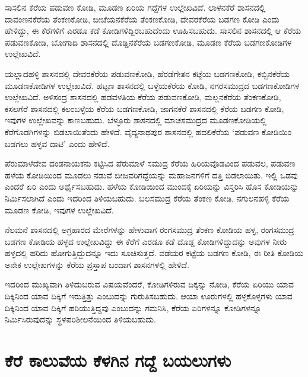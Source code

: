 ಸಾಸಲಿನ ಕೆರೆಯ ಪಡುವಣ ಕೋಡಿ, ಮೂಡಣ ಏರಿಯ ಗದ್ದೆಗಳ ಉಲ್ಲೇಖವಿದೆ. ಲಾಳನಕೆರೆ ಶಾಸನದಲ್ಲಿ ದಾವಂಣನಕೆರೆಯ ತೆಂಕಣಕೋಡಿ, ಬೀಚೆಯನಕೆರೆಯ ತೆಂಕಣಕೋಡಿ, ದೇವರಕೆರೆಯ ಬಡಗಣ ಕೋಡಿ ಎಂದು ಹೇಳಿದ್ದು, ಈ ಕೆರೆಗಳಿಗೆ ಎರಡೂ ಕಡೆ ಕೋಡಿಗಳಿದ್ದಿರಬಹುದೆಂದು ಊಹಿಸಬಹುದು. ಸಾಸಲಿನ ಶಾಸನದಲ್ಲಿ ಆ ಕೆರೆಯ ಪಡುವಣಕೋಡಿ, ಬೋಗಾದಿ ಶಾಸನದಲ್ಲಿ ದೊಡ್ಡಿನಕೆರೆಯ ಬಡಗಣಕೋಡಿ, ಮೂಡಣ ಕೆರೆಯ ಬಡಗಣಕೋಡಿಗಳ ಉಲ್ಲೇಖವಿದೆ.

ಯಲ್ಲಾದಹಳ್ಳಿ ಶಾಸನದಲ್ಲಿ ದೇವರಕೆರೆಯ ಪಡುವಣಕೋಡಿ, ಹೆರಡೆಗೇತನ ಕಟ್ಟೆಯ ಬಡಗಣಕೋಡಿ, ಕಬ್ಬಿನಕೆರೆಯ ಮೂಡಣಕೋಡಿಗಳ ಉಲ್ಲೇಖವಿದೆ. ಹಟ್ಟಣ ಶಾಸನದಲ್ಲಿ ಬಳ್ಳೆಯಕೆರೆಯ ಕೋಡಿ, ನಗರಸಮುದ್ರದ ಬಡಗಣಕೋಡಿಗಳ ಉಲ್ಲೇಖವಿದೆ. ಅಳಿಸಂದ್ರ ಶಾಸನದಲ್ಲಿ ಹಡವಳತಿಯ ಕೆರೆಯ ಪಡುವಣಕೋಡಿ, ಮಲ್ಲನಕೆರೆಯ ತೆಂಕಣಕೋಡಿ, ಕಸಲಗೆರೆ ಶಾಸನದಲ್ಲಿ ಕಲಂಬಳ್ಳೆಯ ಕೆರೆಯ ಬಡಗಣಕೋಡಿ, ಜಾಗನಕೆರೆ ಶಾಸನದಲ್ಲಿ ಕೆರೆಯ ಬಡಗಣ ಕೋಡಿ, ಇವುಗಳ ಉಲ್ಲೇಖವನ್ನು ಕಾಣಬಹುದು. ಬೆಳ್ಳೂರು ಶಾಸನದಲ್ಲಿ ಮಾಚಸಮುದ್ರದ ಮೂಡಣಕೋಡಿಯಲ್ಲಿ ಕೆರೆಗೊಡಗಿಗಳನ್ನು ಬಿಡಲಾಯಿತೆಂದು ಹೇಳಿದೆ. ವೈದ್ಯನಾಥಪುರ ಶಾಸನದಲ್ಲಿ ಹದಲಿಕೆರೆಯ ‘ಪಡುವಣ ಕೋಡಿಯಿಂ ಬಡಗಲು ಹಳ್ಳವ ದಾಟಿ’ ಎಂದು ಹೇಳಿದೆ.

ಪೆರುಮಾಳೆದೇವ ದಂಡನಾಯಕನು ಕಟ್ಟಿಸಿದ ಪೆರುಮಾಳೆ ಸಮುದ್ರ ಕೆರೆಯ ಹಿರಿಯವೊಡವಿಂದ ಪಡುವಲ, ಪಡುವಣ ಹಳೆಯ ಕೋಡಿಯಿಂದ ಮೂಡಲು ನಡುವೆ ಬೀಜವರಿಗದ್ದೆಯನ್ನು ಮಹಾಜನಗಳಿಗೆ ದತ್ತಿ ಬಿಡಲಾಯಿತು. ಇಲ್ಲಿ ಒಡವು ಎಂದರೆ ಏರಿ ಎಂದು ಅರ್ಥೈಸಬಹುದು. ಹಳೆಯ ಕೋಡಿಯಿಂದ ಮುಂದಕ್ಕೆ ಏರಿಯನ್ನು ವಿಸ್ತರಿಸಿ ಹೊಸ ಕೋಡಿಯನ್ನು ನಿರ್ಮಿಸಲಾಗಿದೆ ಎಂದು ಇದರಿಂದ ತಿಳಿಯಬಹುದು. ಬಲಸಮುದ್ರ ಕೆರೆಯ ತೆಂಕಣ ಕೋಡಿ, ನಗುಲನಹಳ್ಳಿ ಕೆರೆಯ ಮೂಡಣ ಕೋಡಿ, ಇವುಗಳ ಉಲ್ಲೇಖವಿದೆ.

ನೆಲಮನೆ ಶಾಸನದಲ್ಲಿ ಅಗ್ರಹಾರದ ಮೇರೆಗಳನ್ನು ಹೇಳುವಾಗ ರಂಗಸಮುದ್ರ ತೆಂಕಣ ಕೋಡಿಯ ಹಳ್ಳ, ರಂಗಸಮುದ್ರ ಬಡಗಣ ಕೋಡಿಯ ಹಳ್ಳದ ಉಲ್ಲೇಖವಿದ್ದು ಈ ಕೆರೆಗೆ ಎರಡೂ ಕಡೆ ದೊಡ್ಡ ಕೋಡಿಗಳಿದ್ದುದನ್ನು ಅವುಗಳ ನೀರು ಹಳ್ಳದಲ್ಲಿ ಹರಿದು ಹೋಗುತ್ತಿದ್ದುದನ್ನೂ ಇದು ಸೂಚಿಸುತ್ತದೆ. ವಡೆಯರ ಕಟ್ಟೆಯ ಬಡಗಣ ಕೋಡಿ, ಈ ರೀತಿ ಕೋಡಿಯ ಅನೇಕ ಉಲ್ಲೇಖಗಳನ್ನು ಕೆರೆಯ ಪ್ರಸ್ತಾಪ ಬಂದಾಗ ಶಾಸನಗಳಲ್ಲಿ ಹೇಳಿದೆ.

ಇದರಿಂದ ಮುಖ್ಯವಾಗಿ ತಿಳಿದುಬರುವ ವಿಷಯವೆಂದರೆ, ಕೋಡಿಗಳಿರುವ ದಿಕ್ಕನ್ನು ನೋಡಿ, ಕೆರೆಯ ಏರಿಯು ಯಾವ ದಿಕ್ಕಿನಿಂದ ಯಾವ ದಿಕ್ಕಿಗೆ ಇರುತ್ತಿತ್ತು ಎಂಬುದನ್ನು ಗುರುತಿಸಬಹುದು. ಆಯಾ ಊರುಗಳಲ್ಲಿ ಹಳ್ಳಕೊಳ್ಳಗಳು ಯಾವ ದಿಕ್ಕಿನಿಂದ ಯಾವ ದಿಕ್ಕಿಗೆ ಹರಿಯುತ್ತಿದ್ದವು ಎಂಬುದನ್ನು ಗಮನಿಸಿ, ಕೆರೆಯ ಏರಿಗಳನ್ನೂ ಕೋಡಿಗಳನ್ನೂ ನಿರ್ಮಿಸಿರುವುದನ್ನು ಸ್ಥಳಪರಿಶೀಲನೆಯಿಂದ ತಿಳಿಯಬಹುದು.


\section{ಕೆರೆ ಕಾಲುವೆಯ ಕೆಳಗಿನ ಗದ್ದೆ ಬಯಲುಗಳು}

